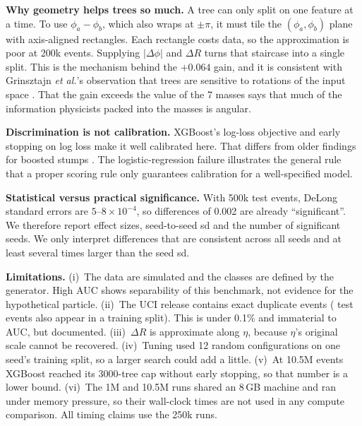 \textbf{Why geometry helps trees so much.} A tree can only split on one feature at a time. To use
$\phi_a-\phi_b$, which also wraps at $\pm\pi$, it must tile the $(\phi_a,\phi_b)$ plane with
axis-aligned rectangles. Each rectangle costs data, so the approximation is poor at 200k events.
Supplying $|\Delta\phi|$ and $\Delta R$ turns that staircase into a single split. This is the
mechanism behind the $+0.064$ gain, and it is consistent with Grinsztajn \emph{et al.}'s observation
that trees are sensitive to rotations of the input space \cite{grinsztajn2022tree}. That the gain
exceeds the value of the 7 masses says that much of the information physicists packed into the
masses is angular.

\textbf{Discrimination is not calibration.} XGBoost's log-loss objective and early stopping on log
loss make it well calibrated here. That differs from older findings for boosted stumps
\cite{niculescu2005predicting}. The logistic-regression failure illustrates the general rule that a
proper scoring rule only guarantees calibration for a well-specified model.

\textbf{Statistical versus practical significance.} With 500k test events, DeLong standard errors
are $5$--$8\times10^{-4}$, so differences of 0.002 are already ``significant''. We therefore report
effect sizes, seed-to-seed sd and the number of significant seeds. We only interpret differences
that are consistent across all seeds and at least several times larger than the seed sd.

\textbf{Limitations.}
(i)~The data are simulated and the classes are defined by the generator. High AUC shows separability
of this benchmark, not evidence for the hypothetical particle.
(ii)~The UCI release contains exact duplicate events (\edaOverlap{} test events also appear in a
training split). This is under 0.1\% and immaterial to AUC, but documented.
(iii)~$\Delta R$ is approximate along $\eta$, because $\eta$'s original scale cannot be recovered.
(iv)~Tuning used 12 random configurations on one seed's training split, so a larger search could
add a little.
(v)~At 10.5M events XGBoost reached its 3000-tree cap without early stopping, so that number is a
lower bound.
(vi)~The 1M and 10.5M runs shared an 8\,GB machine and ran under memory pressure, so their wall-clock
times are not used in any compute comparison. All timing claims use the 250k runs.
